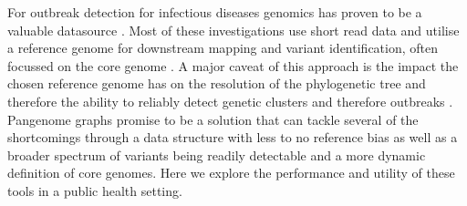 For outbreak detection for infectious diseases genomics has proven to be a valuable datasource \citep{article}. Most of these investigations use short read data \citep{article} and utilise a reference genome for downstream mapping and variant identification, often focussed on the core genome \citep{article}. A major caveat of this approach is the impact the chosen reference genome has on the resolution of the phylogenetic tree and therefore the ability to reliably detect genetic clusters and therefore outbreaks \citep{article}. Pangenome graphs promise to be a solution that can tackle several of the shortcomings through a data structure with less to no reference bias as well as a broader spectrum of variants being readily detectable and a more dynamic definition of core genomes. Here we explore the performance and utility of these tools in a public health setting.